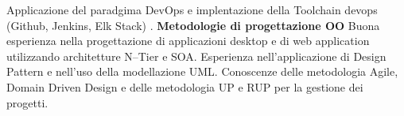 {\textbullet\hspace{5pt}Applicazione del paradgima DevOps e implentazione della Toolchain devops (Github, Jenkins, Elk Stack)  .\newline
{}\newline
\textbf{Metodologie di progettazione OO}\newline
\textbullet\hspace{5pt}Buona esperienza nella progettazione di applicazioni desktop e di web application utilizzando architetture N--Tier e SOA.\newline
\textbullet\hspace{5pt}Esperienza nell'applicazione di Design Pattern e nell'uso della modellazione UML.\newline
\textbullet\hspace{5pt}Conoscenze delle metodologia Agile, Domain Driven Design e delle metodologia UP e RUP per la gestione dei progetti.\newline
}

